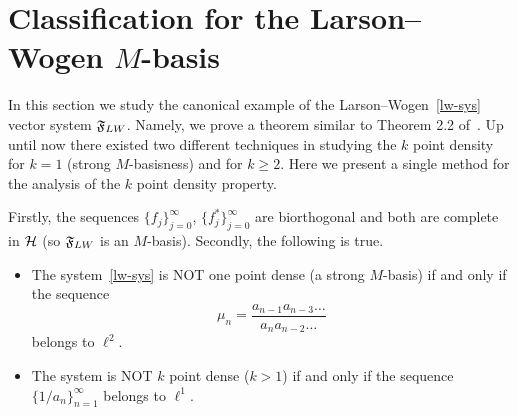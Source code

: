 \section{Classification for the Larson--Wogen $M$-basis}
  \label{section:lw-sys}
  In this section we study the canonical example of the Larson--Wogen~\eqref{lw-sys} vector system $\fsys_{LW}$.
  Namely, we prove a theorem similar to Theorem 2.2 of~\cite{katavolos}.
  Up until now there existed two different techniques in studying the $k$ point density for $k=1$ (strong $M$-basisness) and for $k\geq2$.
  Here we present a single method for the analysis of the $k$ point density property.
  \begin{theorem}
    \label{thm:katavolos}
    Firstly, the sequences $\{f_j\}_{j=0}^\infty$, $\{f^*_j\}_{j=0}^\infty$ are biorthogonal
      and both are complete in $\cal{H}$ (so $\fsys_{LW}$ is an $M$-basis).
    Secondly, the following is true.
    \begin{itemize}
      \item  The system~\eqref{lw-sys} is NOT one point dense (a strong $M$-basis) if and only if the sequence
        \begin{equation}
          \mu_n = \frac{a_{n-1} a_{n-3} \dots}{a_{n} a_{n-2} \dots }
        \end{equation}
        belongs to $\ell^2$.
      \item The system is NOT $k$ point dense ($k > 1$) if and only if the sequence $\{1/a_n\}_{n=1}^\infty$ belongs to $\ell^1$.
    \end{itemize}
  \end{theorem}
